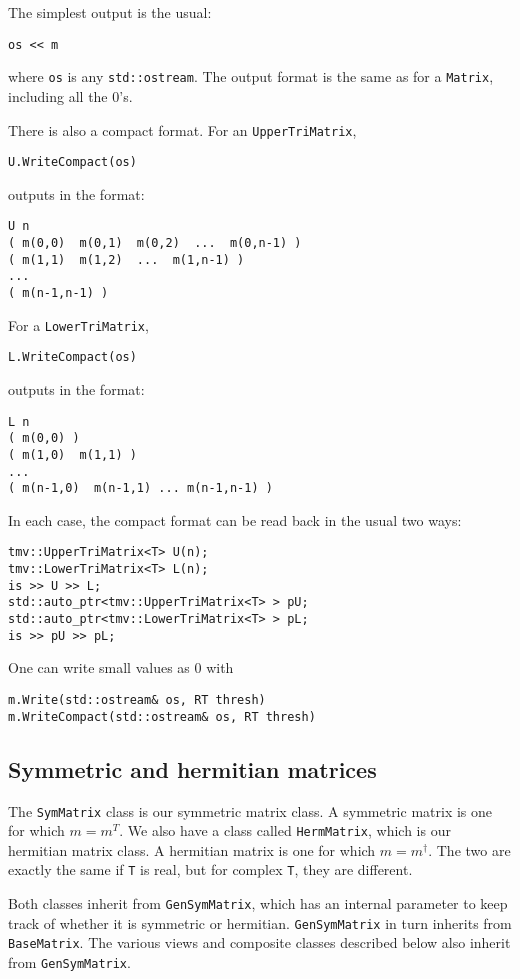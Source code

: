 \documentclass[twoside,letterpaper,11pt]{article}
\renewcommand{\tt}[1]{{\texttt {#1}}}
\begin{document}
The simplest output is the usual:
\begin{verbatim}
os << m
\end{verbatim}
where \tt{os} is any \tt{std::ostream}.
The output format is the same as for a \tt{Matrix}, including all the 0's.

There is also a compact format.  For an \tt{UpperTriMatrix},
\begin{verbatim}
U.WriteCompact(os)
\end{verbatim}
outputs in the format:
\begin{verbatim}
U n 
( m(0,0)  m(0,1)  m(0,2)  ...  m(0,n-1) )
( m(1,1)  m(1,2)  ...  m(1,n-1) )
...
( m(n-1,n-1) )
\end{verbatim}
For a \tt{LowerTriMatrix},
\begin{verbatim}
L.WriteCompact(os)
\end{verbatim}
outputs in the format:
\begin{verbatim}
L n 
( m(0,0) )
( m(1,0)  m(1,1) )
...
( m(n-1,0)  m(n-1,1) ... m(n-1,n-1) )
\end{verbatim}

In each case, the compact format can be read back in the usual two ways:
\begin{verbatim}
tmv::UpperTriMatrix<T> U(n);
tmv::LowerTriMatrix<T> L(n);
is >> U >> L;
std::auto_ptr<tmv::UpperTriMatrix<T> > pU;
std::auto_ptr<tmv::LowerTriMatrix<T> > pL;
is >> pU >> pL;
\end{verbatim}

One can write small values as 0 with
\begin{verbatim}
m.Write(std::ostream& os, RT thresh)
m.WriteCompact(std::ostream& os, RT thresh)
\end{verbatim}

\subsection{Symmetric and hermitian matrices}

The \tt{SymMatrix} class is our symmetric matrix class.  A symmetric matrix is
one for which $m = m^T$.  We also have a class called
\tt{HermMatrix}, which is our hermitian matrix class.  A hermitian matrix
is one for which $m = m^\dagger$.  The two are exactly the same 
if \tt{T} is real, but for complex \tt{T}, they are different.

Both classes inherit from \tt{GenSymMatrix},
which has an internal parameter to keep track
of whether it is symmetric or hermitian.
\tt{GenSymMatrix} in turn inherits from \tt{BaseMatrix}.  
The various views and composite classes described below 
also inherit from \tt{GenSymMatrix}.
\end{document}

